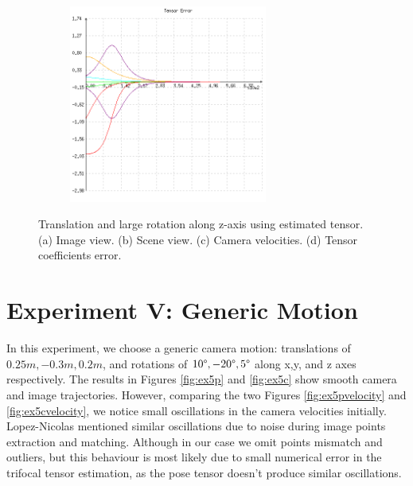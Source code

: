 \begin{figure}[ht!]
\begin{mdframed}[linecolor=black!30,backgroundcolor=black!5]
\begin{subfigure}{.48\textwidth}
    \caption{}
    \label{fig:ex4cvelocity}
  \end{subfigure}
  \begin{subfigure}{.48\textwidth}
    \centering
    \includegraphics[width=65mm]{figures/plots/ex4cerror.png}
    \caption{}
    \label{fig:ex4cerror}
  \end{subfigure}
  \caption{Translation and large rotation along z-axis using estimated tensor. (a) Image view. (b) Scene view. (c) Camera velocities. (d) Tensor coefficients error.}
  \label{fig:ex4c}
\end{mdframed}
\end{figure}

\section{Experiment V: Generic Motion}
In this experiment, we choose a generic camera motion: translations of $0.25m, -0.3m, 0.2m$, and rotations of $10\text{\textdegree}, -20\text{\textdegree}, 5\text{\textdegree}$ along x,y, and z axes respectively. The results in Figures \ref{fig:ex5p} and \ref{fig:ex5c} show smooth camera and image trajectories. However, comparing the two Figures \ref{fig:ex5pvelocity} and \ref{fig:ex5cvelocity}, we notice small oscillations in the camera velocities initially. Lopez-Nicolas \cite{lopez2010visual} mentioned similar oscillations due to noise during image points extraction and matching. Although in our case we omit points mismatch and outliers, but this behaviour is most likely due to small numerical error in the trifocal tensor estimation, as the pose tensor doesn't produce similar oscillations.

